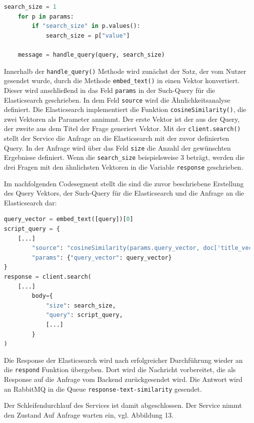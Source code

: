 \begin{lstlisting}[language=Python, caption={Auslesen der search\_{}size und Ausführen der KI}]
search_size = 1
    for p in params:
        if "search_size" in p.values():
            search_size = p["value"]

    message = handle_query(query, search_size)
\end{lstlisting}

Innerhalb der \texttt{handle\_{}query()} Methode wird zunächst der Satz, der vom Nutzer gesendet wurde, durch die Methode \texttt{embed\_{}text()} in einen Vektor konvertiert. Dieser wird anschließend in das Feld \texttt{\glqq params\grqq{}} in der Such-Query für die Elasticsearch geschrieben. In dem Feld \texttt{\glqq source\grqq{}} wird die Ähnlichkeitsanalyse definiert. Die Elasticsearch implementiert die Funktion \texttt{cosineSimilarity()}, die zwei Vektoren als Parameter annimmt. Der erste Vektor ist der aus der Query, der zweite aus dem Titel der Frage generiert Vektor. Mit der \texttt{client.search()} stellt der Service die Anfrage an die Elasticsearch mit der zuvor definierten Query. In der Anfrage wird über das Feld \texttt{\glqq size\grqq} die Anzahl der gewünschten Ergebnisse definiert. Wenn die \texttt{search\_{}size} beispielsweise 3 beträgt, werden die drei Fragen mit den ähnlichsten Vektoren in die Variable \texttt{response} geschrieben. 

Im nachfolgenden Codesegment stellt die sind die zuvor beschriebene Erstellung des Query Vektors, der Such-Query für die Elasticsearch und die Anfrage an die Elasticsearch dar:

\begin{lstlisting}[language=Python, caption={Ähnlichkeitssuche in der Elasticsearch}]
query_vector = embed_text([query])[0]
script_query = {
    [...]
        "source": "cosineSimilarity(params.query_vector, doc['title_vector']) + 1.0",
        "params": {"query_vector": query_vector}  
}
response = client.search(
    [...]
        body={
            "size": search_size,
            "query": script_query,
            [...]
        }
)
\end{lstlisting}

Die Response der Elasticsearch wird nach erfolgreicher Durchführung wieder an die \texttt{respond} Funktion übergeben. Dort wird die Nachricht vorbereitet, die als Response auf die Anfrage vom Backend zurückgesendet wird. Die Antwort wird an RabbitMQ in die Queue \texttt{response-text-similarity} gesendet.

Der Schleifendurchlauf des Services ist damit abgeschlossen. Der Service nimmt den Zustand \glqq Auf Anfrage warten\grqq{} ein, vgl. Abbildung 13. 

